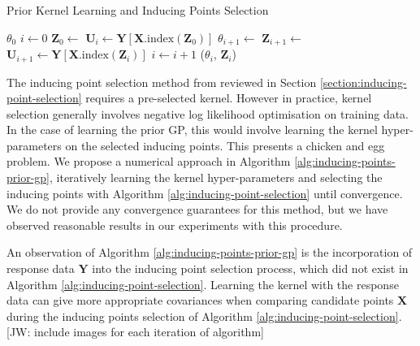 \documentclass{article}
\newcommand{\jw}[1]{{\color{gray} [JW: #1]}}
\numberwithin{equation}{section}
\begin{document}
\begin{algorithm}[h!]
\caption{Prior Kernel Learning and Inducing Points Selection}\label{alg:inducing-points-prior-gp}
\begin{algorithmic}
\Require $\theta_0$ 
 \State $i \leftarrow 0$
  \State $\mathbf{Z}_0 \leftarrow$  
  \State $\mathbf{U}_i \leftarrow \mathbf{Y}\left[\mathbf{X}.\text{index}\left(\mathbf{Z}_0\right)\right]$  
\State $\theta_{i+1} \leftarrow$  
\State $\mathbf{Z}_{i+1} \leftarrow$  
\State $\mathbf{U}_{i+1} \leftarrow \mathbf{Y}\left[\mathbf{X}.\text{index}\left(\mathbf{Z}_i\right)\right]$
\State $i \leftarrow i+1$
\EndWhile
\State \Return ($\theta_i$, $\mathbf{Z}_i$)
\end{algorithmic}
\end{algorithm}

The inducing point selection method from \cite{burt2020convergence} reviewed in Section \ref{section:inducing-point-selection} requires a pre-selected kernel. 
However in practice, kernel selection generally involves negative log likelihood optimisation on training data. 
In the case of learning the prior GP, this would involve learning the kernel hyper-parameters on the selected inducing points. 
This presents a chicken and egg problem. 
We propose a numerical approach in Algorithm \ref{alg:inducing-points-prior-gp}, iteratively learning the kernel hyper-parameters and selecting the inducing points with Algorithm \ref{alg:inducing-point-selection} until convergence.
We do not provide any convergence guarantees for this method, but we have observed reasonable results in our experiments with this procedure. 

An observation of Algorithm \ref{alg:inducing-points-prior-gp} is the incorporation of response data $\mathbf{Y}$ into the inducing point selection process, which did not exist in Algorithm \ref{alg:inducing-point-selection}. Learning the kernel with the response data can give more appropriate covariances when comparing candidate points $\mathbf{X}$ during the inducing points selection of Algorithm \ref{alg:inducing-point-selection}. \jw{include images for each iteration of algorithm}
\end{document}
